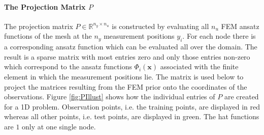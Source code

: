 \documentclass[%
  a4paper,oneside,%
  11pt,%
  smallchapters,
  style=printdev,
  extramargin,
  green,%
  rgb, <cmyk>
  ]{tubsbook}
\begin{document}
\paragraph{The Projection Matrix $P$}
The projection matrix $P \in \mathbb{R}^{n_y \times n_u}$ is constructed by evaluating all $n_u$ FEM ansatz functions of the mesh at the $n_y$ measurement positions $y_i$. For each node there is a corresponding ansatz function which can be evaluated all over the domain. The result is a sparse matrix with most entries zero and only those entries non-zero which correspond to the ansatz functions $\Phi_i(\bm{\bm{x}})$ associated with the finite element in which the measurement positions lie. The matrix is used below to project the matrices resulting from the FEM prior onto the coordinates of the observations. Figure \ref{fig:PIllust} shows how the individual entries of $P$ are created for a 1D problem. Observation points, i.e. the training points, are displayed in red whereas all other points, i.e. test points, are displayed in green. The hat functions are $1$ only at one single node.
%
\end{document}
